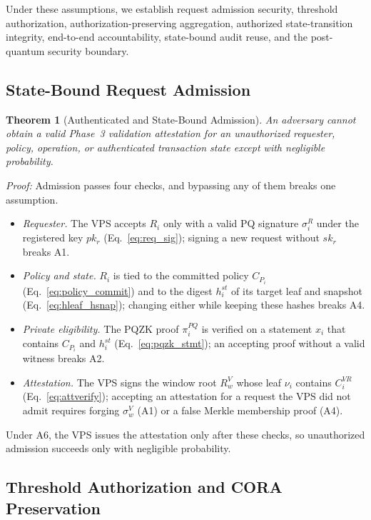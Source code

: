 \documentclass[lettersize,journal]{IEEEtran}
\newtheorem{theorem}{Theorem}
\begin{document}
Under these assumptions, we establish request admission security,
threshold authorization, authorization-preserving aggregation,
authorized state-transition integrity, end-to-end accountability,
state-bound audit reuse, and the post-quantum security boundary.

\subsection{State-Bound Request Admission}

\begin{theorem}[Authenticated and State-Bound Admission]
An adversary cannot obtain a valid Phase~3 validation attestation for
an unauthorized requester, policy, operation, or authenticated
transaction state except with negligible probability.
\end{theorem}

\emph{Proof:} Admission passes four checks, and bypassing any of them
breaks one assumption.
\begin{itemize}[leftmargin=*,nosep]
\item \emph{Requester.} The VPS accepts $R_i$ only with a valid PQ
signature $\sigma_i^R$ under the registered key $pk_r$
(Eq.~\eqref{eq:req_sig}); signing a new request without $sk_r$ breaks
A1.
\item \emph{Policy and state.} $R_i$ is tied to the committed policy
$C_{P_i}$ (Eq.~\eqref{eq:policy_commit}) and to the digest $h_i^{st}$ of
its target leaf and snapshot (Eq.~\eqref{eq:hleaf_hsnap}); changing
either while keeping these hashes breaks A4.
\item \emph{Private eligibility.} The PQZK proof $\pi_i^{PQ}$ is verified
on a statement $x_i$ that contains $C_{P_i}$ and $h_i^{st}$
(Eq.~\eqref{eq:pqzk_stmt}); an accepting proof without a valid witness
breaks A2.
\item \emph{Attestation.} The VPS signs the window root $R_w^V$ whose
leaf $\nu_i$ contains $C_i^{VR}$ (Eq.~\eqref{eq:attverify}); accepting an
attestation for a request the VPS did not admit requires forging
$\sigma_w^V$ (A1) or a false Merkle membership proof (A4).
\end{itemize}
Under A6, the VPS issues the attestation only after these checks, so
unauthorized admission succeeds only with negligible probability.

\subsection{Threshold Authorization and CORA Preservation}
\end{document}

